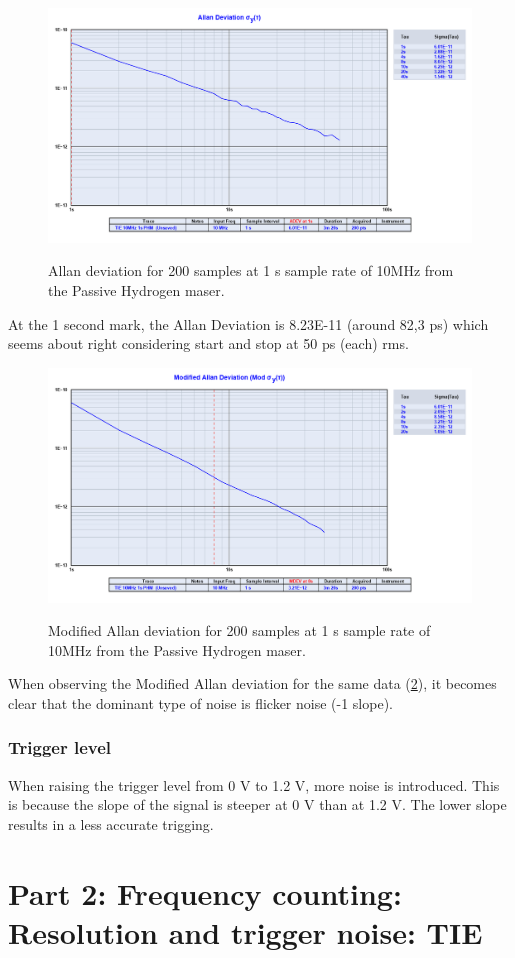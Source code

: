 \documentclass[11pt,english,a4paper]{article}
\begin{document}
\begin{figure}[!htb]
  \caption{Allan deviation for 200 samples at 1 s sample rate of 10MHz from the Passive Hydrogen maser.}
  \centering
    \includegraphics[width=1\textwidth]{phm10mhz1s_allan.png}
    \label{fig:allan_dev1}
\end{figure}
At the 1 second mark, the Allan Deviation is 8.23E-11 (around 82,3 ps) which seems about right considering start and stop at 50 ps (each) rms. 

\begin{figure}[!htb]
  \caption{Modified Allan deviation for 200 samples at 1 s sample rate of 10MHz from the Passive Hydrogen maser.}
  \centering
    \includegraphics[width=1\textwidth]{phm10mhz1s_modified_allan.png}
    \label{fig:mod_allan_dev1}
\end{figure}
When observing the Modified Allan deviation for the same data (\ref{fig:mod_allan_dev1}), it becomes clear that the dominant type of noise is flicker noise (-1 slope).

\newpage
\subsubsection{Trigger level}
When raising the trigger level from 0 V to 1.2 V, more noise is introduced. This is because the slope of the signal is steeper at 0 V than at 1.2 V. The lower slope results in a less accurate trigging. 

\section{Part 2: Frequency counting: Resolution and trigger noise: TIE}
\end{document}
